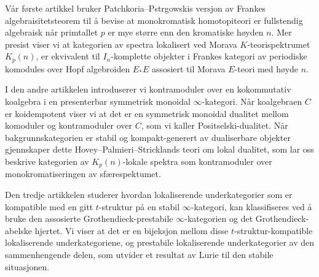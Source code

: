 Vår første artikkel bruker Patchkoria--Pstr\a{}gowskis versjon av Frankes algebraisitetsteorem til å bevise at monokromatisk homotopiteori er fullstendig algebraisk når primtallet $p$ er mye større enn den kromatiske høyden $n$. Mer presist viser vi at kategorien av spectra lokalisert ved Morava $K$-teorispektrumet $K_p(n)$, er ekvivalent til $I_n$-komplette objekter i Frankes kategori av periodiske komodules over Hopf algebroiden $E_*E$ assosiert til Morava $E$-teori med høyde $n$. 

I den andre artikkelen introduserer vi kontramoduler over en kokommutativ koalgebra i en presenterbar symmetrisk monoidal $\infty$-kategori. Når koalgebraen $C$ er koidempotent viser vi at det er en symmetrisk monoidal dualitet mellom komoduler og kontramoduler over $C$, som vi kaller Positselski-dualitet. Når bakgrunnskategorien er stabil og kompakt-generert av dualiserbare objekter gjennskaper dette Hovey--Palmieri--Stricklands teori om lokal dualitet, som lar oss beskrive kategorien av $K_p(n)$-lokale spektra som kontramoduler over monokromatiseringen av sfærespektumet. 

Den tredje artikkelen studerer hvordan lokaliserende underkategorier som er kompatible med en gitt $t$-struktur på en stabil $\infty$-kategori, kan klassifiseres ved å bruke den assosierte Grothendieck-prestabile $\infty$-kategorien og det Grothendieck-abelske hjertet. Vi viser at det er en bijeksjon mellom disse $t$-struktur-kompatible lokaliserende underkategoriene, og prestabile lokaliserende underkategorier av den sammenhengende delen, som utvider et resultat av Lurie til den stabile situasjonen. 


